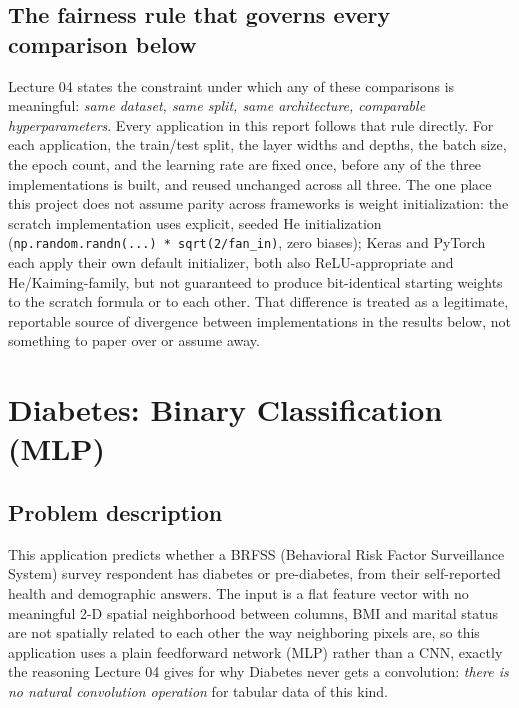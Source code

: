 \documentclass[11pt]{article}
\newcommand{\code}[1]{\texttt{#1}}
\begin{document}
\subsection{The fairness rule that governs every comparison below}

Lecture 04 states the constraint under which any of these comparisons is
meaningful: \textit{same dataset, same split, same architecture, comparable
hyperparameters}. Every application in this report follows that rule
directly. For each application, the train/test split, the layer widths and
depths, the batch size, the epoch count, and the learning rate are fixed once,
before any of the three implementations is built, and reused unchanged across
all three. The one place this project does not assume parity across
frameworks is weight initialization: the scratch implementation uses explicit,
seeded He initialization (\code{np.random.randn(...) * sqrt(2/fan\_in)}, zero
biases); Keras and PyTorch each apply their own default initializer, both also
ReLU-appropriate and He/Kaiming-family, but not guaranteed to produce
bit-identical starting weights to the scratch formula or to each other. That
difference is treated as a legitimate, reportable source of divergence between
implementations in the results below, not something to paper over or assume
away.

\newpage
\section{Diabetes: Binary Classification (MLP)}
\label{sec:diabetes}

\subsection{Problem description}

This application predicts whether a BRFSS (Behavioral Risk Factor
Surveillance System) survey respondent has diabetes or pre-diabetes, from
their self-reported health and demographic answers. The input is a flat
feature vector with no meaningful 2-D spatial neighborhood between columns,
BMI and marital status are not spatially related to each other the way
neighboring pixels are, so this application uses a plain feedforward network
(MLP) rather than a CNN, exactly the reasoning Lecture 04 gives for why
Diabetes never gets a convolution: \textit{there is no natural convolution
operation} for tabular data of this kind.
\end{document}
